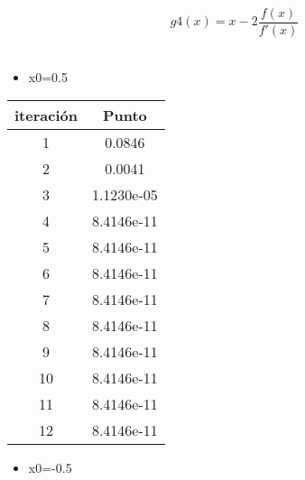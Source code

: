 \documentclass{udparticle}
\begin{document}
\begin{enumerate}
\begin{enumerate}
\begin{table}[H]
\begin{tabular} { |c|c|}
        
        \end{tabular}
        
    \end{table}
 \vspace{2cm}
     \begin{equation}
 g4(x) = x-2\frac{f(x)}
{f'(x)}
\end{equation}
\\
 \begin{itemize}
\item x0=0.5
\end{itemize}

\begin{table}[H]
    \centering
        \begin{tabular} { |c|c|}
        
        \hline
        iteración  &  Punto\\
        \hline
        1 &      0.0846   \\
         \hline
        2 &    0.0041    \\
         \hline
        3 &   1.1230e-05 \\
         \hline
        4 &   8.4146e-11    \\
         \hline
        5 &   8.4146e-11   \\
         \hline
        6 &   8.4146e-11     \\
         \hline
        7 & 8.4146e-11   \\
         \hline
        8 &  8.4146e-11   \\
         \hline
        9 &   8.4146e-11      \\
         \hline
        10 &   8.4146e-11      \\
         \hline
        11 & 8.4146e-11   \\
         \hline
        12 &  8.4146e-11      \\
        
        
        \end{tabular}
        
    \end{table}
     \begin{itemize}
\item x0=-0.5
\end{itemize}

\begin{table}[H]
    \centering
        \begin{tabular} { |c|c|}
        

\end{tabular}
\end{table}
\end{enumerate}
\end{enumerate}
\end{document}
